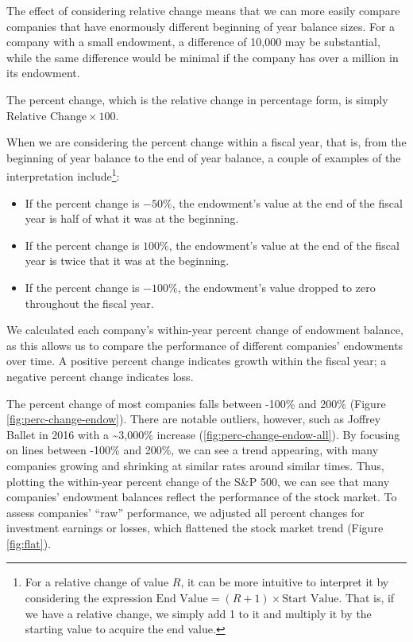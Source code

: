 \documentclass[Dance Data
Project,article,submit,moreauthors,pdftex]{mdpi}
\providecommand{\tightlist}{%
  \setlength{\itemsep}{0pt}\setlength{\parskip}{0pt}}
\begin{document}
The effect of considering relative change means that we can more easily
compare companies that have enormously different beginning of year
balance sizes. For a company with a small endowment, a difference of
10,000 may be substantial, while the same difference would be minimal if
the company has over a million in its endowment.

The percent change, which is the relative change in percentage form, is
simply \(\text{Relative Change} \times 100\).

When we are considering the percent change within a fiscal year, that
is, from the beginning of year balance to the end of year balance, a
couple of examples of the interpretation include\footnote{For a relative
  change of value \(R\), it can be more intuitive to interpret it by
  considering the expression
  \(\text{End Value} = (R+1) \times \text{Start Value}.\) That is, if we
  have a relative change, we simply add 1 to it and multiply it by the
  starting value to acquire the end value.}:

\begin{itemize}
\tightlist
\item
  If the percent change is \(-50\%\), the endowment's value at the end
  of the fiscal year is half of what it was at the beginning.
\item
  If the percent change is \(100\%\), the endowment's value at the end
  of the fiscal year is twice that it was at the beginning.\\
\item
  If the percent change is \(-100\%\), the endowment's value dropped to
  zero throughout the fiscal year.
\end{itemize}

We calculated each company's within-year percent change of endowment
balance, as this allows us to compare the performance of different
companies' endowments over time. A positive percent change indicates
growth within the fiscal year; a negative percent change indicates loss.

The percent change of most companies falls between -100\% and 200\%
(Figure \ref{fig:perc-change-endow}). There are notable outliers,
however, such as Joffrey Ballet in 2016 with a \textasciitilde3,000\%
increase (\ref{fig:perc-change-endow-all}). By focusing on lines between
-100\% and 200\%, we can see a trend appearing, with many companies
growing and shrinking at similar rates around similar times. Thus,
plotting the within-year percent change of the S\&P 500, we can see that
many companies' endowment balances reflect the performance of the stock
market. To assess companies' ``raw'' performance, we adjusted all
percent changes for investment earnings or losses, which flattened the
stock market trend (Figure \ref{fig:flat}).
\end{document}
